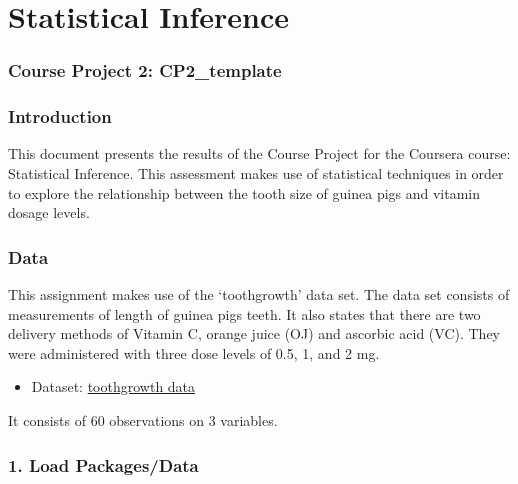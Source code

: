 \documentclass[]{article}
\title{}
\author{}
\date{}
\begin{document}
\maketitle


\section{Statistical Inference}\label{statistical-inference}

\subsubsection{Course Project 2:
CP2\_template}\label{course-project-2-cp2ux5ftemplate}

\subsubsection{Introduction}\label{introduction}

This document presents the results of the Course Project for the
Coursera course: Statistical Inference. This assessment makes use of
statistical techniques in order to explore the relationship between the
tooth size of guinea pigs and vitamin dosage levels.

\subsubsection{Data}\label{data}

This assignment makes use of the `toothgrowth' data set. The data set
consists of measurements of length of guinea pigs teeth. It also states
that there are two delivery methods of Vitamin C, orange juice (OJ) and
ascorbic acid (VC). They were administered with three dose levels of
0.5, 1, and 2 mg.

\begin{itemize}
\itemsep1pt\parskip0pt
\item
  Dataset:
  \href{https://stat.ethz.ch/R-manual/R-devel/library/datasets/html/ToothGrowth.html}{toothgrowth
  data}
\end{itemize}

It consists of 60 observations on 3 variables.

\subsubsection{1. Load Packages/Data}\label{load-packagesdata}
\end{document}

